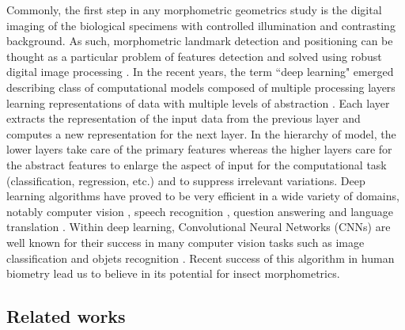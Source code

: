 \documentclass[review]{elsarticle}
\begin{document}
Commonly, the first step in any morphometric geometrics study is the digital imaging of the biological specimens with controlled illumination and contrasting background. As such, morphometric landmark detection and positioning can be thought as a particular problem of features detection and solved using robust digital image processing \cite{gonzalez_digital_2006}. In the recent years, the term ``deep learning" emerged describing class of computational models composed of multiple processing layers learning representations of data with multiple levels of abstraction \cite{lecun2015deep}. Each layer extracts the representation of the input data from the previous layer and computes a new representation for the next layer. In the hierarchy of model, the lower layers take care of the primary features whereas the higher layers care for the abstract features to enlarge the aspect of input for the computational task (classification, regression, etc.) and to suppress irrelevant variations. Deep learning algorithms have proved to be very efficient in a wide variety of domains, notably computer vision \cite{krizhevsky2012imagenet, ciregan2012multi, szegedy2015going, li2015convolutional,tompson2014joint}, speech recognition \cite{mikolov2011strategies, hinton2012deep, sainath2013deep}, question answering \cite{bordes2014question} and language translation \cite{sutskever2014sequence, jean2014using}.
Within deep learning, Convolutional Neural Networks (CNNs) are well known for their success in many computer vision tasks such as image classification \cite{krizhevsky2012imagenet,ciregan2012multi} and  objets recognition \cite{li2015convolutional,tompson2014joint}.
Recent success of this algorithm in human biometry \cite{cintas2016automatic} lead us to believe in its potential for insect morphometrics.  


\subsection{Related works}\label{rw}
\end{document}
